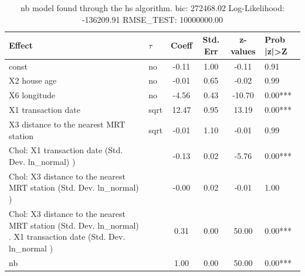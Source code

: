 \begin{table}
	\caption{nb model found through the hs algorithm. bic: 272468.02 Log-Likelihood: -136209.91 RMSE_TEST: 10000000.00}
	\begin{center}
		\begin{tabular}{|l|l|c|c|c|l|}
			\hline
			Effect & $\tau$ & Coeff & Std. Err & z-values & Prob |z|>Z \\
			\hline
			const & no & -0.11 & 1.00 & -0.11 & 0.91 \\
			\hline
			X2 house age & no & -0.01 & 0.65 & -0.02 & 0.99 \\
			\hline
			X6 longitude & no & -4.56 & 0.43 & -10.70 & 0.00*** \\
			\hline
			X1 transaction date & sqrt & 12.47 & 0.95 & 13.19 & 0.00*** \\
			\hline
			X3 distance to the nearest MRT station & sqrt & -0.01 & 1.10 & -0.01 & 0.99 \\
			\hline
			 Chol: X1 transaction date (Std. Dev. ln_normal) ) &  & -0.13 & 0.02 & -5.76 & 0.00*** \\
			\hline
			 Chol: X3 distance to the nearest MRT station (Std. Dev. ln_normal) ) &  & -0.00 & 0.02 & -0.01 & 1.00 \\
			\hline
			 Chol: X3 distance to the nearest MRT station (Std. Dev. ln_normal) . X1 transaction date (Std. Dev.   ln_normal ) &  & 0.31 & 0.00 & 50.00 & 0.00*** \\
			\hline
			nb &  & 1.00 & 0.00 & 50.00 & 0.00*** \\
			\hline
		\end{tabular}
	\end{center}
\end{table}